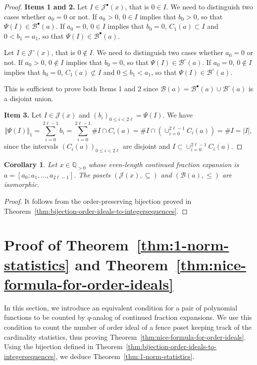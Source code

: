 \documentclass[a4paper,12pt]{amsart}
\newtheorem{corollary}[definition]{Corollary}
\newcommand{\Q}{\mathbb{Q}}
\newcommand{\xx}{{x}}
\newcommand{\Bcal}{{\mathcal{B}}}
\newcommand{\Jcal}{{\mathcal{J}}}
\newcommand{\0}{\mathtt{0}}
\newcommand{\1}{\mathtt{1}}
\newcommand{\2}{\mathtt{2}}
\newcommand{\3}{\mathtt{3}}
\newcommand{\size}[1]{
    {|#1|}                 %
}
\begin{document}
\begin{proof}
    \textbf{Items 1 and 2.}
    Let $I\in \Jcal^\bullet(\xx)$, that is $0\in I$.
    We need to distinguish two cases whether $a_0=0$ or not.
    If $a_0>0$, $0\in I$ implies that $b_0>0$, so that
    $\Psi(I)\in \Bcal^\bullet(a)$.
    If $a_0=0$, $0\in I$ implies that $b_0=0$, $C_1(a)\subset I$ and $0<b_1=a_1$, so that
    $\Psi(I)\in \Bcal^\bullet(a)$.

    Let $I\in \Jcal^\circ(\xx)$, that is $0\notin I$.
    We need to distinguish two cases whether $a_0=0$ or not.
    If $a_0>0$, $0\notin I$ implies that $b_0=0$, so that
    $\Psi(I)\in \Bcal^\circ(a)$.
    If $a_0=0$, $0\notin I$ implies that $b_0=0$, $C_1(a)\not\subset I$ and $0\leq b_1<a_1$, so that
    $\Psi(I)\in \Bcal^\circ(a)$.

    This is sufficient to prove
    both Items 1 and 2 since
    $\Bcal(a)=\Bcal^\bullet(a)\cup \Bcal^\circ(a)$ is a disjoint union.

    \textbf{Item 3.}
    Let $I\in \Jcal(\xx)$ and $(b_i)_{0\leq i< 2\ell}=\Psi(I)$. We have
    \[
        \Vert\Psi(I)\Vert_1
        = \sum_{i=0}^{2\ell-1} b_i
        = \sum_{i=0}^{2\ell-1} \# I\cap C_i(a)
        = \# I\cap \left(\cup_{i=0}^{2\ell-1} C_i(a)\right)
        = \# I = \size{I},
    \]
    since the intervals $(C_i(a))_{0\leq i< 2\ell}$ are disjoint
    and $I\subset \cup_{i=0}^{2\ell-1} C_i(a)$.
\end{proof}

\begin{corollary}\label{cor:poset-isomorphism-order-ideals-to-admissible}
Let $x\in\Q_{>0}$ whose even-length continued fraction expansion is $a=[a_0;a_1,\dots,a_{2\ell-1}]$.
The posets
    $(\Jcal(\xx), \subseteq)$
    and
    $(\Bcal(a), \leq)$ are isomorphic.
\end{corollary}

\begin{proof}
    It follows from the order-preserving bijection proved in
    Theorem~\ref{thm:bijection-order-ideals-to-integersequences}.
\end{proof}


\section{Proof of
Theorem~\ref{thm:1-norm-statistics} and
Theorem~\ref{thm:nice-formula-for-order-ideals}}
\label{sec:proof-of-Theorems-B-and-D}

In this section, we introduce an equivalent condition for a pair of polynomial
functions to be counted by $q$-analog of continued fraction expansions.
We use this condition to count the number of order ideal of a fence poset
keeping track of the cardinality statistics,
thus proving Theorem~\ref{thm:nice-formula-for-order-ideals}.
Using the bijection defined in Theorem~\ref{thm:bijection-order-ideals-to-integersequences},
we deduce Theorem~\ref{thm:1-norm-statistics}.
\end{document}
